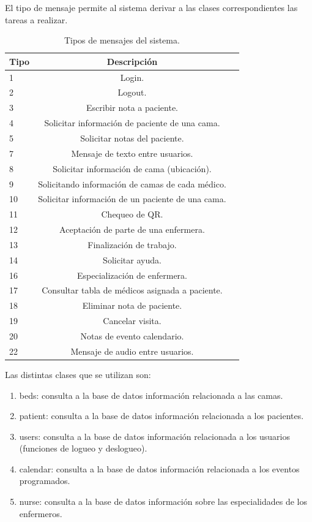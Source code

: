 El tipo de mensaje permite al sistema derivar a las clases correspondientes las tareas a realizar. 

\begin{table}[h]
	\centering
	\caption[Tipos de mensajes MQTT]{Tipos de mensajes del sistema.}
	\begin{tabular}{l c c}    
		\toprule
		\textbf{Tipo}     & \textbf{Descripción} \\
		\midrule
		1 & Login.    \\		
		2 & Logout.\\
		3 & Escribir nota a paciente.\\
		4 & Solicitar información de paciente de una cama.\\
		5 & Solicitar notas del paciente. \\
		7 & Mensaje de texto entre usuarios.\\
		8 & Solicitar información de cama (ubicación).\\
		9 & Solicitando información de camas de cada médico.\\
		10 & Solicitar información de un paciente de una cama.\\
		11 & Chequeo de QR.\\
		12 & Aceptación de parte de una enfermera.\\
		13 & Finalización de trabajo.\\
		14 & Solicitar ayuda.\\
		16 & Especialización de enfermera.\\
		17 & Consultar tabla de médicos asignada a paciente.\\
		18 & Eliminar nota de paciente.\\
		19 & Cancelar visita.\\
		20 & Notas de evento calendario.\\
		22 & Mensaje de audio entre usuarios.\\
		\bottomrule
		\hline
	\end{tabular}
	\label{tab:Modelo}
\end{table}

Las distintas clases que se utilizan son: 
\begin{enumerate}
\item beds: consulta a la base de datos información relacionada a las camas.
\item patient: consulta a la base de datos información relacionada a los pacientes. 
\item users: consulta a la base de datos información relacionada a los usuarios (funciones de logueo y deslogueo).
\item calendar: consulta a la base de datos información relacionada a los eventos programados.
\item nurse: consulta a la base de datos información sobre las especialidades de los enfermeros.
\end{enumerate}

